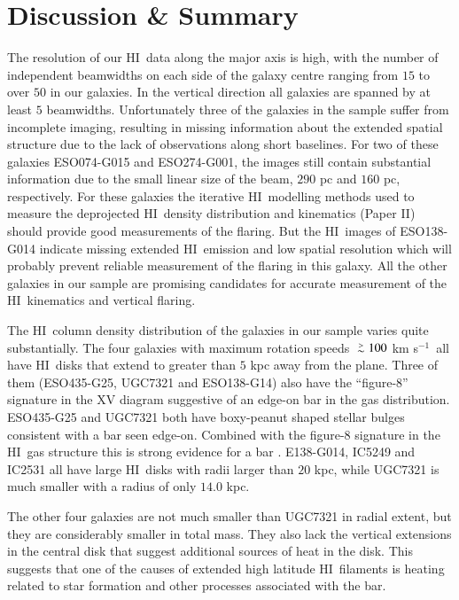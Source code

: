 \documentclass[traditabstract]{aa} %
\newcommand\gesim{\lower.5ex\hbox{$\; \buildrel > \over \sim \;$}}
\newcommand\HI{H{\small I}}
\newcommand\kms{km s$^{-1}$}
\begin{document}
\section{Discussion \& Summary}
\label{sec:disc-HI}

The resolution of our \HI\ data along the major axis is high, with
the number of independent beamwidths on each side of the galaxy centre
ranging from $15$ to over $50$ in our galaxies. In the vertical
direction all galaxies are spanned by at least $5$ beamwidths.
Unfortunately three of the galaxies in the sample suffer from
incomplete imaging, resulting in missing information about the
extended spatial structure due to the lack of observations along short
baselines. For two of these galaxies ESO074-G015 and ESO274-G001, the
images still contain substantial information due to the small linear
size of the beam, $290$ pc and $160$ pc, respectively. For these 
galaxies the iterative
\HI\ modelling methods used to measure the deprojected \HI\ density
distribution and kinematics (Paper II) should provide good measurements of 
the flaring.  But the \HI\ images of ESO138-G014 indicate missing 
extended \HI\ emission and low spatial resolution which will probably 
prevent reliable measurement of the flaring in this galaxy. All the 
other galaxies in our sample are promising candidates for accurate
measurement of the \HI\ kinematics and vertical flaring.

The \HI\ column density distribution of the galaxies in our sample
varies quite substantially. The four galaxies with maximum rotation
speeds $\gesim 100$ \kms\ all have \HI\ disks that extend to greater than
$5$ kpc away from the plane. Three of them (ESO435-G25, UGC7321 and
ESO138-G14) also have the ``figure-8'' signature in the XV diagram
suggestive of an edge-on bar in the gas distribution. ESO435-G25
\citep{bf1999} and UGC7321 \citep{pbld2003} both have boxy-peanut
shaped stellar bulges consistent with a bar seen edge-on. Combined
with the figure-8 signature in the \HI\ gas structure this is strong
evidence for a bar \citep{km1995,bf1999,ab1999,athanassoula2000}.
E138-G014, IC5249 and IC2531 all have large \HI\ disks with radii
larger than $20$ kpc, while UGC7321 is much smaller with a radius of
only $14.0$ kpc.

The other four galaxies are not much smaller than UGC7321 in radial
extent, but they are considerably smaller in total mass. They also lack
the vertical extensions in the central disk that suggest additional
sources of heat in the disk. This suggests that one of the causes of
extended high latitude \HI\ filaments is heating related to star
formation and other processes associated with the bar.
\end{document}
